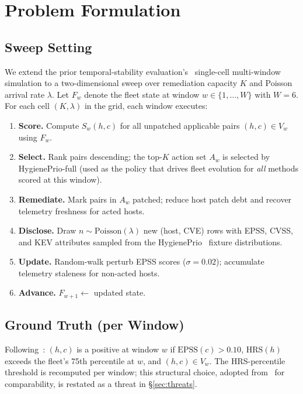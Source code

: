 \section{Problem Formulation}
\label{sec:problem}

\subsection{Sweep Setting}

We extend the prior temporal-stability evaluation's~\cite{paper5temporal} single-cell multi-window simulation
to a two-dimensional sweep over remediation capacity $K$ and Poisson
arrival rate $\lambda$. Let $F_w$ denote the fleet state at window $w \in
\{1, \ldots, W\}$ with $W = 6$. For each cell $(K, \lambda)$ in the grid,
each window executes:

\begin{enumerate}
\item \textbf{Score.} Compute $S_w(h, c)$ for all unpatched applicable
pairs $(h, c) \in V_w$ using $F_w$.
\item \textbf{Select.} Rank pairs descending; the top-$K$ action set
$A_w$ is selected by HygienePrio-full (used as the policy that drives
fleet evolution for \textit{all} methods scored at this window).
\item \textbf{Remediate.} Mark pairs in $A_w$ patched; reduce host
patch debt and recover telemetry freshness for acted hosts.
\item \textbf{Disclose.} Draw $n \sim \mathrm{Poisson}(\lambda)$ new
(host, CVE) rows with EPSS, CVSS, and KEV attributes sampled from the
HygienePrio~\cite{paper4hygieneprio} fixture distributions.
\item \textbf{Update.} Random-walk perturb EPSS scores ($\sigma = 0.02$);
accumulate telemetry staleness for non-acted hosts.
\item \textbf{Advance.} $F_{w+1} \leftarrow$ updated state.
\end{enumerate}

\subsection{Ground Truth (per Window)}

Following~\cite{paper5temporal}: $(h, c)$ is a positive at
window $w$ if $\mathrm{EPSS}(c) > 0.10$, $\mathrm{HRS}(h)$ exceeds the
fleet's 75th percentile at $w$, and $(h, c) \in V_w$. The HRS-percentile
threshold is recomputed per window; this structural choice, adopted
from~\cite{paper5temporal} for comparability, is restated as a threat
in \S\ref{sec:threats}.

